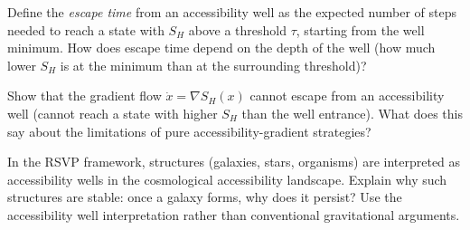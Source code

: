 \begin{exercise}
  Define the \emph{escape time} from an accessibility well as the
  expected number of steps needed to reach a state with $S_H$ above
  a threshold $\tau$, starting from the well minimum. How does escape
  time depend on the depth of the well (how much lower $S_H$ is at the
  minimum than at the surrounding threshold)?
\end{exercise}

\begin{exercise}
  Show that the gradient flow $\dot{x} = \nabla S_H(x)$ cannot escape
  from an accessibility well (cannot reach a state with higher $S_H$
  than the well entrance). What does this say about the limitations of
  pure accessibility-gradient strategies?
\end{exercise}

\begin{exercise}[title={Cosmological}]
  In the RSVP framework, structures (galaxies, stars, organisms) are
  interpreted as accessibility wells in the cosmological accessibility
  landscape. Explain why such structures are stable: once a galaxy forms,
  why does it persist? Use the accessibility well interpretation rather
  than conventional gravitational arguments.
\end{exercise}
